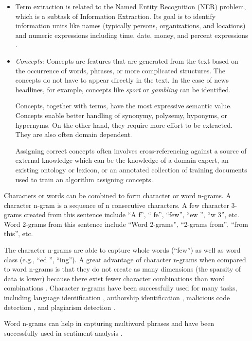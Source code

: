 \begin{itemize}
    \item Term extraction is related to the Named Entity Recognition (NER) problem, 
which is a subtask of Information Extraction. Its goal is to identify information 
units like names (typically persons, organizations, and locations) and numeric 
expressions including time, date, money, and percent expressions \cite{ref205}.

    \item \textit{Concepts:} Concepts are features that are generated from the text based
on the occurrence of words, phrases, or more complicated structures. The
concepts do not have to appear directly in the text. In the case of news
headlines, for example, concepts like \textit{sport} or \textit{gambling} can be identified.

Concepts, together with terms, have the most expressive semantic value.
Concepts enable better handling of synonymy, polysemy, hyponyms, or
hypernyms. On the other hand, they require more effort to be extracted.
They are also often domain dependent.

Assigning correct concepts often involves cross-referencing against a
source of external knowledge which can be the knowledge of a domain
expert, an existing ontology or lexicon, or an annotated collection of
training documents used to train an algorithm assigning concepts.
\end{itemize}

Characters or words can be combined to form character or word n-grams.
A character n-gram is a sequence of n consecutive characters. A few character
3-grams created from this sentence include “A f”, “ fe”, “few”, “ew ”, “w 3”,
etc. Word 2-grams from this sentence include “Word 2-grams”, “2-grams from”,
“from this”, etc.

The character n-grams are able to capture whole words (“few”) as well as
word class (e.g., “ed ”, “ing”). A great advantage of character n-grams when
compared to word n-grams is that they do not create as many dimensions (the
sparsity of data is lower) because there exist fewer character combinations
than word combinations \cite{ref139}. Character n-grams have been successfully used
for many tasks, including language identification \cite{ref38}, authorship identification
\cite{ref118}, malicious code detection \cite{ref223}, and plagiarism detection \cite{ref17}.

Word n-grams can help in capturing multiword phrases \cite{ref163} and have been
successfully used in sentiment analysis \cite{ref273}.

